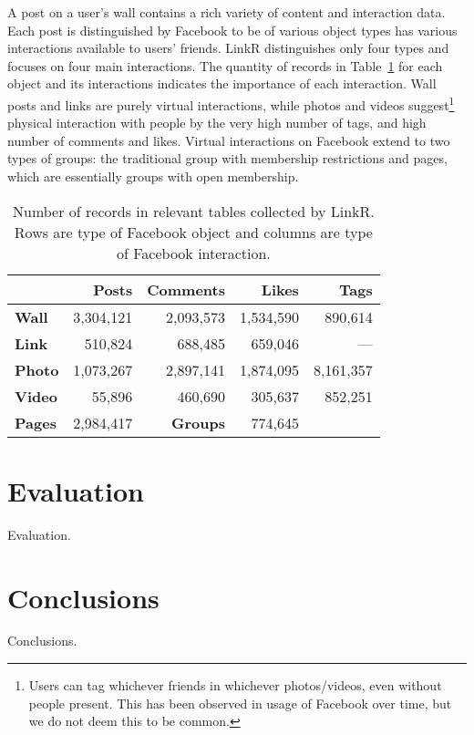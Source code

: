 \documentclass[letterpaper]{article}
\begin{document}
A post on a user's wall contains a rich variety of content and interaction data. Each post is distinguished by Facebook to be of various object types has various interactions available to users' friends. LinkR distinguishes only four types and focuses on four main interactions. The quantity of records in Table~\ref{tab:db} for each object and its interactions indicates the importance of each interaction. Wall posts and links are purely virtual interactions, while photos and videos suggest\footnote{Users can tag whichever friends in whichever photos/videos, even without people present. This has been observed in usage of Facebook over time, but we do not deem this to be common.} physical interaction with people by the very high number of tags, and high number of comments and likes. Virtual interactions on Facebook extend to two types of groups: the traditional group with membership restrictions and pages, which are essentially groups with open membership.


\begin{table}
\caption{\small Number of records in relevant tables collected by LinkR. Rows are type of Facebook object and columns are type of Facebook interaction.}
\label{tab:db}
\begin{tabular}{|>{\small}l|>{\small}r|>{\small}r|>{\small}r|>{\small}r|}
\hline
 & \textbf{Posts} & \textbf{Comments} & \textbf{Likes} & \textbf{Tags} \\
\hline
\textbf{Wall} & 3,304,121 & 2,093,573 & 1,534,590 & 890,614 \\
\hline
\textbf{Link} & 510,824 & 688,485 & 659,046 & --- \\
\hline
\textbf{Photo} & 1,073,267 & 2,897,141 & 1,874,095 & 8,161,357 \\
\hline
\textbf{Video} & 55,896 & 460,690 & 305,637 & 852,251 \\
\hline
\hline
\textbf{Pages} & 2,984,417 & \textbf{Groups} & 774,645 & \\
\hline
\end{tabular}
\end{table}


\section{Evaluation}


Evaluation.


\section{Conclusions}


Conclusions.




\end{document}
